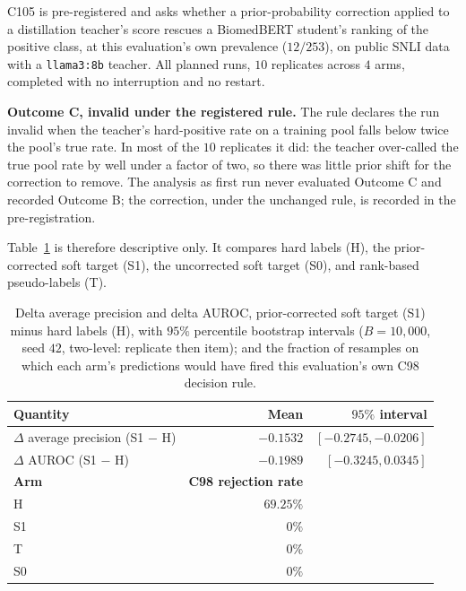 C105 is pre-registered and asks whether a prior-probability correction applied to a distillation
teacher's score rescues a BiomedBERT student's ranking of the positive class, at this
evaluation's own prevalence ($12/253$), on public SNLI data with a \texttt{llama3:8b} teacher.
All planned runs, $10$ replicates across $4$ arms, completed with no interruption and no
restart.

\textbf{Outcome C, invalid under the registered rule.} The rule declares the run invalid when the
teacher's hard-positive rate on a training pool falls below twice the pool's true rate. In most of
the $10$ replicates it did: the teacher over-called the true pool rate by well under a factor of
two, so there was little prior shift for the correction to remove. The analysis as first run never
evaluated Outcome C and recorded Outcome B; the correction, under the unchanged rule, is recorded in
the pre-registration.

Table~\ref{sup:tab:s5-c105} is therefore descriptive only. It compares hard labels (H), the
prior-corrected soft target (S1), the uncorrected soft target (S0), and rank-based pseudo-labels
(T).

\begin{table}[H]
\caption[C105, delta versus hard labels and resampled rejection rate]{Delta average precision
and delta AUROC, prior-corrected soft target (S1) minus hard labels (H), with $95\%$ percentile
bootstrap intervals ($B = 10{,}000$, seed $42$, two-level: replicate then item); and the fraction
of resamples on which each arm's predictions would have fired this evaluation's own C98 decision
rule.}
\centering
\begin{tabular}{lrr}
\toprule
\textbf{Quantity} & \textbf{Mean} & \textbf{$95\%$ interval} \\
\midrule
$\Delta$ average precision (S1 $-$ H) & $-0.1532$ & $[-0.2745, -0.0206]$ \\
$\Delta$ AUROC (S1 $-$ H)             & $-0.1989$ & $[-0.3245, 0.0345]$ \\
\midrule
\textbf{Arm} & \textbf{C98 rejection rate} & \\
\midrule
H  & $69.25\%$ & \\
S1 & $0\%$     & \\
T  & $0\%$     & \\
S0 & $0\%$     & \\
\bottomrule
\end{tabular}
\label{sup:tab:s5-c105}
\end{table}

